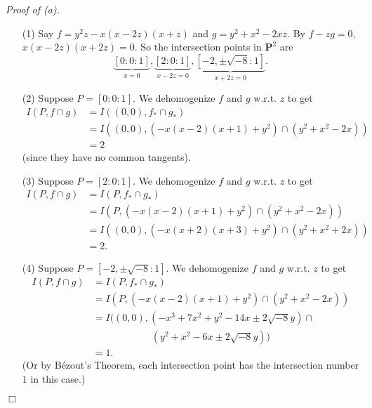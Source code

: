 \documentclass{article}
\begin{document}
\emph{Proof of (a).}
\begin{enumerate}
\item[(1)]
  Say $f = y^2z - x(x-2z)(x+z)$ and $g = y^2 + x^2 - 2xz$.
  By $f - zg = 0$, $x(x-2z)(x+2z) = 0$.
  So the intersection points in $\mathbf{P}^{2}$ are
  \[
    \underbrace{[0:0:1]}_{x = 0},
    \underbrace{[2:0:1]}_{x-2z = 0},
    \underbrace{[-2,\pm\sqrt{-8}:1]}_{x+2z = 0}.
  \]

\item[(2)]
  Suppose $P = [0:0:1]$.
  We dehomogenize $f$ and $g$ w.r.t. $z$ to get
  \begin{align*}
    I(P, f \cap g)
    &= I((0,0), f_{*} \cap g_{*}) \\
    &= I((0,0), (-x(x-2)(x+1) + y^2) \cap (y^2 + x^2 - 2x)) \\
    &= 2
  \end{align*}
  (since they have no common tangents).

\item[(3)]
  Suppose $P = [2:0:1]$.
  We dehomogenize $f$ and $g$ w.r.t. $z$ to get
  \begin{align*}
    I(P, f \cap g)
    &= I(P, f_{*} \cap g_{*}) \\
    &= I(P, (-x(x-2)(x+1) + y^2) \cap (y^2 + x^2 - 2x)) \\
    &= I((0,0), (-x(x+2)(x+3) + y^2) \cap (y^2 + x^2 + 2x)) \\
    &= 2.
  \end{align*}

\item[(4)]
  Suppose $P = [-2,\pm\sqrt{-8}:1]$.
  We dehomogenize $f$ and $g$ w.r.t. $z$ to get
  \begin{align*}
    I(P, f \cap g)
    &= I(P, f_{*} \cap g_{*}) \\
    &= I(P, (-x(x-2)(x+1) + y^2) \cap (y^2 + x^2 - 2x)) \\
    &= I((0,0), (-x^3 + 7x^2 + y^2 - 14x \pm 2\sqrt{-8}y) \cap \\
      & \qquad\qquad\qquad
      (y^2 + x^2 - 6x \pm 2\sqrt{-8}y)) \\
    &= 1.
  \end{align*}
  (Or by B\'ezout's Theorem,
  each intersection point has the intersection number $1$ in this case.)
\end{enumerate}
$\Box$ \\
\end{document}
